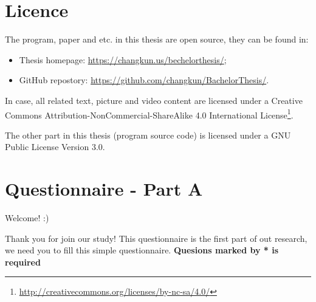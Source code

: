 
\appendix

  \chapter{Licence}
  \label{appendix:a}

  The program, paper and etc. in this thesis are open source, they can be found in:
    \begin{itemize}
        \item Thesis homepage: \url{https://changkun.us/bechelorthesis/};
        \item GitHub repostory: \url{https://github.com/changkun/BachelorThesis/}.
    \end{itemize}



  In case, all related text, picture and video content are licensed under a Creative Commons Attribution-NonCommercial-ShareAlike 4.0 International License\footnote{\url{http://creativecommons.org/licenses/by-nc-sa/4.0/}}.

  The other part in this thesis (program source code) is licensed under a GNU Public License Version 3.0.


  \cleardoublepage

  \chapter{Questionnaire - Part A}
  \label{appendix:b}

  Welcome! :)

  Thank you for join our study! This questionnaire is the first part of out research, we need you to fill this simple questionnaire.
  \textbf{Quesions marked by * is required}

